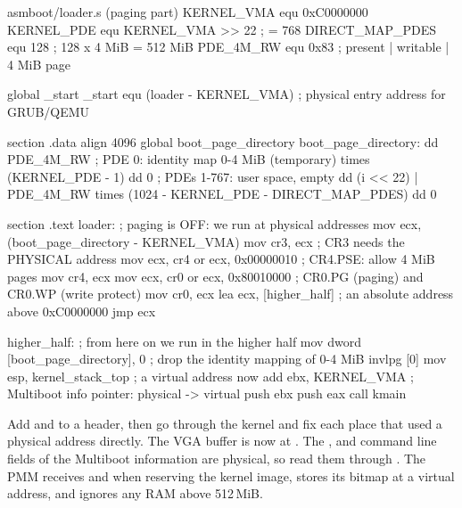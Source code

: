 \documentclass[11pt,a4paper]{article}
\begin{document}
\begin{lst}{asm}{boot/loader.s (paging part)}
KERNEL_VMA      equ 0xC0000000
KERNEL_PDE      equ KERNEL_VMA >> 22        ; = 768
DIRECT_MAP_PDES equ 128                     ; 128 x 4 MiB = 512 MiB
PDE_4M_RW       equ 0x83                    ; present | writable | 4 MiB page

global _start
_start equ (loader - KERNEL_VMA)            ; physical entry address for GRUB/QEMU

section .data
align 4096
global boot_page_directory
boot_page_directory:
    dd PDE_4M_RW                            ; PDE 0: identity map 0-4 MiB (temporary)
    times (KERNEL_PDE - 1) dd 0             ; PDEs 1-767: user space, empty
    dd (i << 22) | PDE_4M_RW
    times (1024 - KERNEL_PDE - DIRECT_MAP_PDES) dd 0

section .text
loader:                                     ; paging is OFF: we run at physical addresses
    mov  ecx, (boot_page_directory - KERNEL_VMA)
    mov  cr3, ecx                           ; CR3 needs the PHYSICAL address
    mov  ecx, cr4
    or   ecx, 0x00000010                    ; CR4.PSE: allow 4 MiB pages
    mov  cr4, ecx
    mov  ecx, cr0
    or   ecx, 0x80010000                    ; CR0.PG (paging) and CR0.WP (write protect)
    mov  cr0, ecx
    lea  ecx, [higher_half]                 ; an absolute address above 0xC0000000
    jmp  ecx

higher_half:                                ; from here on we run in the higher half
    mov  dword [boot_page_directory], 0     ; drop the identity mapping of 0-4 MiB
    invlpg [0]
    mov  esp, kernel_stack_top              ; a virtual address now
    add  ebx, KERNEL_VMA                    ; Multiboot info pointer: physical -> virtual
    push ebx
    push eax
    call kmain
\end{lst}

Add  and  to a header, then go through the kernel and fix each place that used a physical
address directly. The VGA buffer is now at . The ,  and command
line fields of the Multiboot information are physical, so read them through . The PMM receives
 and  when reserving the kernel image, stores its bitmap at a virtual
address, and ignores any RAM above 512\,MiB.
\end{document}
